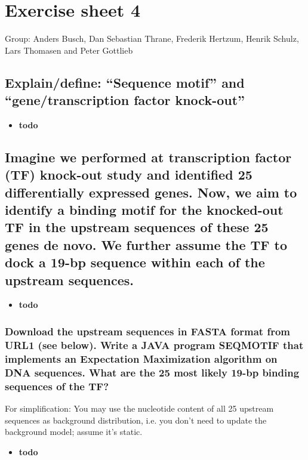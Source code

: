 \documentclass[a4paper,10pt,titlepage]{article}
\begin{document}
\section*{Exercise sheet 4}

Group: Anders Busch, Dan Sebastian Thrane, Frederik Hertzum, Henrik Schulz, Lars Thomasen and Peter Gottlieb

\subsection*{Explain/define: “Sequence motif” and “gene/transcription factor knock-out”}

\begin{itemize}
\item
\textbf{todo}
\end{itemize}

\subsection*{Imagine we performed at transcription factor (TF) knock-out study and identified 25 differentially expressed genes. Now, we aim to identify a binding motif for the knocked-out TF in the upstream sequences of these 25 genes de novo. We further assume the TF to dock a 19-bp sequence within each of the upstream sequences. }

\begin{itemize}
\item
\textbf{todo}
\end{itemize}

\subsubsection{Download the upstream sequences in FASTA format from URL1 (see below). Write a JAVA program SEQMOTIF that implements an Expectation Maximization algorithm on DNA sequences. What are the 25 most likely 19-bp binding sequences of the TF?}

For simplification: You may use the nucleotide content of all 25 upstream sequences as background distribution, i.e. you don’t need to update the background model; assume it’s static.

\begin{itemize}
\item
\textbf{todo}
\end{itemize}
\end{document}
